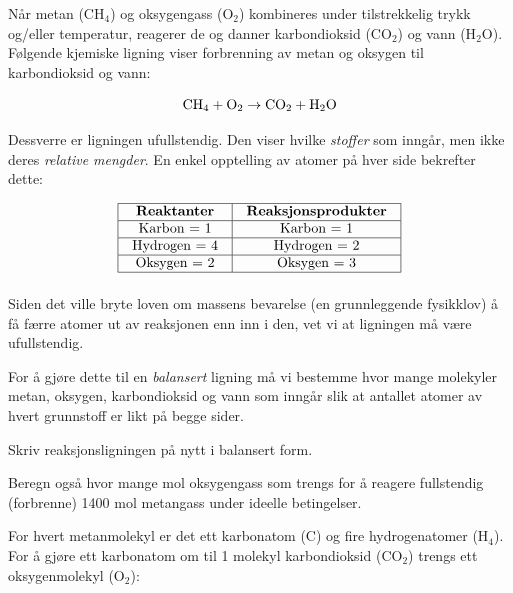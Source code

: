 

Når metan (CH$_{4}$) og oksygengass (O$_{2}$) kombineres under tilstrekkelig trykk og/eller temperatur, reagerer de og danner karbondioksid (CO$_{2}$) og vann (H$_{2}$O). Følgende kjemiske ligning viser forbrenning av metan og oksygen til karbondioksid og vann:

$$\hbox{CH}_4 + \hbox{O}_2 \to \hbox{CO}_2 + \hbox{H}_2\hbox{O}$$

Dessverre er ligningen ufullstendig. Den viser hvilke {\it stoffer} som inngår, men ikke deres {\it relative mengder}. En enkel opptelling av atomer på hver side bekrefter dette:


$$\vbox{\offinterlineskip
\halign{\strut
\vrule \quad\hfil # \ \hfil & 
\vrule \quad\hfil # \ \hfil \vrule \cr
\noalign{\hrule}
%
{\bf Reaktanter} & {\bf Reaksjonsprodukter} \cr
%
\noalign{\hrule}
%
Karbon = 1 & Karbon = 1 \cr
%
\noalign{\hrule}
%
Hydrogen = 4 & Hydrogen = 2 \cr
%
\noalign{\hrule}
%
Oksygen = 2 & Oksygen = 3 \cr
%
\noalign{\hrule}
} %
}$$ %

Siden det ville bryte loven om massens bevarelse (en grunnleggende fysikklov) å få færre atomer ut av reaksjonen enn inn i den, vet vi at ligningen må være ufullstendig.

For å gjøre dette til en {\it balansert} ligning må vi bestemme hvor mange molekyler metan, oksygen, karbondioksid og vann som inngår slik at antallet atomer av hvert grunnstoff er likt på begge sider.

\vskip 10pt

Skriv reaksjonsligningen på nytt i balansert form.

\vskip 10pt

Beregn også hvor mange mol oksygengass som trengs for å reagere fullstendig (forbrenne) 1400 mol metangass under ideelle betingelser.







For hvert metanmolekyl er det ett karbonatom (C) og fire hydrogenatomer (H$_{4}$). For å gjøre ett karbonatom om til 1 molekyl karbondioksid (CO$_{2}$) trengs ett oksygenmolekyl (O$_{2}$):


